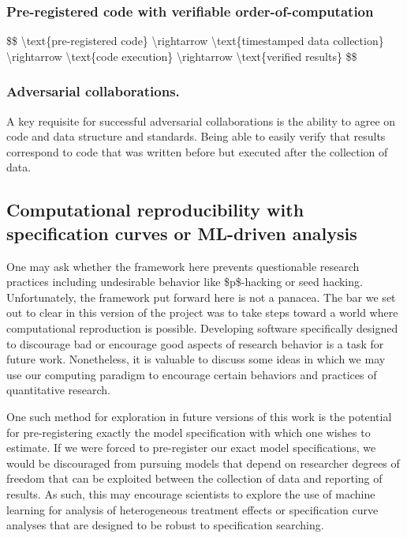 \hypertarget{pre-registered-code-with-verifiable-order-of-computation}{%
\subsubsection{Pre-registered code with verifiable order-of-computation}\label{pre-registered-code-with-verifiable-order-of-computation}}

\$\$ \textbackslash{}text\{pre-registered code\} \textbackslash{}rightarrow \textbackslash{}text\{timestamped data collection\} \textbackslash{}rightarrow \textbackslash{}text\{code execution\} \textbackslash{}rightarrow \textbackslash{}text\{verified results\} \$\$

\hypertarget{adversarial-collaborations.}{%
\subsubsection{Adversarial collaborations.}\label{adversarial-collaborations.}}

A key requisite for successful adversarial collaborations is the ability to agree on code and data structure and standards. Being able to easily verify that results correspond to code that was written before but executed after the collection of data.

\hypertarget{computational-reproducibility-with-specification-curves-or-ml-driven-analysis}{%
\subsection{Computational reproducibility with specification curves or ML-driven analysis}\label{computational-reproducibility-with-specification-curves-or-ml-driven-analysis}}

One may ask whether the framework here prevents questionable research practices including undesirable behavior like \$p\$-hacking or seed hacking. Unfortunately, the framework put forward here is not a panacea. The bar we set out to clear in this version of the project was to take steps toward a world where computational reproduction is possible. Developing software specifically designed to discourage bad or encourage good aspects of research behavior is a task for future work. Nonetheless, it is valuable to discuss some ideas in which we may use our computing paradigm to encourage certain behaviors and practices of quantitative research.

One such method for exploration in future versions of this work is the potential for pre-registering exactly the model specification with which one wishes to estimate. If we were forced to pre-register our exact model specifications, we would be discouraged from pursuing models that depend on researcher degrees of freedom that can be exploited between the collection of data and reporting of results. As such, this may encourage scientists to explore the use of machine learning for analysis of heterogeneous treatment effects or specification curve analyses that are designed to be robust to specification searching. 

